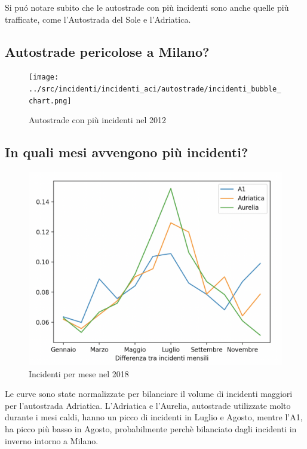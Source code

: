 \documentclass[a4paper]{report}
\begin{document}
Si pu\'o notare subito che le autostrade con più incidenti sono anche quelle più trafficate, come 
l'Autostrada del Sole e l'Adriatica.




\subsection{Autostrade pericolose a Milano?}

\begin{figure}
    \texttt{[image: ../src/incidenti/incidenti\_aci/autostrade/incidenti\_bubble\_chart.png]}
    \caption{Autostrade con più incidenti nel 2012}
    \label{fig:bubble_incidenti_milano}
\end{figure}




\subsection{In quali mesi avvengono più incidenti?}
\begin{figure}
    \includegraphics[width=\linewidth]{../src/incidenti/incidenti_aci/autostrade/mesi_autostrade.png}
    \caption{Incidenti per mese nel 2018}
    \label{fig:incidenti_per_mese}
\end{figure}

Le curve sono state normalizzate per bilanciare il volume di incidenti maggiori per 
l'autostrada Adriatica.
L'Adriatica e l'Aurelia, autostrade utilizzate molto durante i mesi caldi, hanno un picco di 
incidenti in Luglio e Agosto, mentre l'A1, ha picco più basso in Agosto, probabilmente 
perchè bilanciato dagli incidenti in inverno intorno a Milano.
\end{document}
